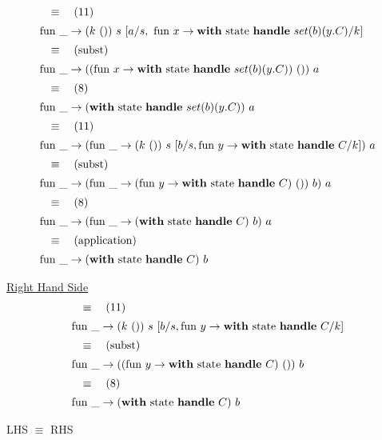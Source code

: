 \documentclass[logo,bsc,singlespacing,parskip]{infthesis}
\begin{document}
\[ 
\begin{array}{l}
\quad\equiv\quad (11) \\[5pt]
\text{fun }\_ \rightarrow (k\ ())\ s\ [a/s,\ \text{fun } x \rightarrow \text{\textbf{with} state \textbf{handle} } set(b)(y.C)/k] \\[5pt]
\quad\equiv\quad (\text{subst}) \\[5pt]
\text{fun }\_ \rightarrow ((\text{fun } x \rightarrow \text{\textbf{with} state \textbf{handle} } set(b)(y.C))\ ())\ a \\[5pt]
\quad\equiv\quad (8) \\[5pt]
\text{fun }\_ \rightarrow (\text{\textbf{with} state \textbf{handle} } set(b)(y.C))\ a \\[5pt]
\quad\equiv\quad (11) \\[5pt]
\text{fun }\_ \rightarrow (\text{fun }\_ \rightarrow (k\ ())\ s\ [b/s, \text{fun } y \rightarrow \text{\textbf{with} state \textbf{handle} } C/k])\ a \\[5pt]
\quad\equiv\quad (\text{subst}) \\[5pt]
\text{fun }\_ \rightarrow (\text{fun }\_ \rightarrow (\text{fun } y \rightarrow \text{\textbf{with} state \textbf{handle} } C)\ ())\ b)\ a \\[5pt]
\quad\equiv\quad (8) \\[5pt]
\text{fun }\_ \rightarrow (\text{fun }\_ \rightarrow (\text{\textbf{with} state \textbf{handle} } C)\ b)\ a \\[5pt]
\quad\equiv\quad (\text{application}) \\[5pt]
\text{fun }\_ \rightarrow (\text{\textbf{with} state \textbf{handle} } C)\ b
\end{array}
\]

\underline{Right Hand Side}
\[ 
\begin{array}{l}
\quad\equiv\quad (11) \\[5pt]
\text{fun }\_ \rightarrow (k\ ())\ s\ [b/s, \text{fun } y \rightarrow \text{\textbf{with} state \textbf{handle} } C/k] \\[5pt]
\quad\equiv\quad (\text{subst}) \\[5pt]
\text{fun }\_ \rightarrow ((\text{fun } y \rightarrow \text{\textbf{with} state \textbf{handle} } C)\ ())\ b \\[5pt]
\quad\equiv\quad (8) \\[5pt]
\text{fun }\_ \rightarrow (\text{\textbf{with} state \textbf{handle} } C)\ b
\end{array}
\]

LHS $\equiv$ RHS
\end{document}
